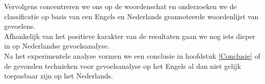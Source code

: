 Vervolgens concentreren we ons op de woordenschat en  onderzoeken we de classificatie op basis van een Engels en Nederlands geannoteerde woordenlijst van gevoelens.\\
Afhankelijk van het positieve karakter van de resultaten gaan we nog iets dieper in op Nederlandse gevoelsanalyse.\\
Na het experimentele analyse vormen we een conclusie in hoofdstuk \ref{Conclusie} of de gevonden technieken voor gevoelsanalyse op het Engels al dan niet gelijk toepasbaar zijn op het Nederlands. 